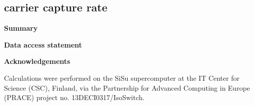 \subsection{carrier capture rate}




\textbf{Summary}

\textbf{Data access statement}

\textbf{Acknowledgements}

Calculations were performed on the SiSu supercomputer at the IT Center for Science (CSC), Finland, via the Partnership for Advanced Computing in Europe (PRACE) project no. 13DECI0317/IsoSwitch.

